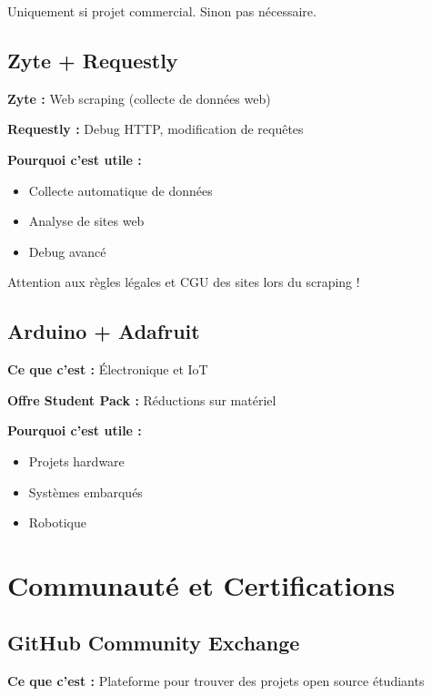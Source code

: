 \documentclass[11pt,a4paper]{article}
\begin{document}
\begin{conseil}
Uniquement si projet commercial. Sinon pas nécessaire.
\end{conseil}

\subsection{Zyte + Requestly}

\textbf{Zyte :} Web scraping (collecte de données web)

\textbf{Requestly :} Debug HTTP, modification de requêtes

\textbf{Pourquoi c'est utile :}
\begin{itemize}
    \item Collecte automatique de données
    \item Analyse de sites web
    \item Debug avancé
\end{itemize}

\begin{important}
Attention aux règles légales et CGU des sites lors du scraping !
\end{important}

\subsection{Arduino + Adafruit}

\textbf{Ce que c'est :} Électronique et IoT

\textbf{Offre Student Pack :} Réductions sur matériel

\textbf{Pourquoi c'est utile :}
\begin{itemize}
    \item Projets hardware
    \item Systèmes embarqués
    \item Robotique
\end{itemize}

\newpage
\section{Communauté et Certifications}

\subsection{GitHub Community Exchange}

\textbf{Ce que c'est :} Plateforme pour trouver des projets open source étudiants
\end{document}
